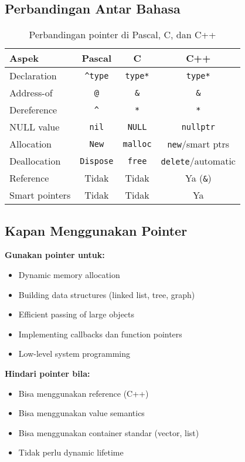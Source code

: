 \documentclass[../main.tex]{subfiles}
\begin{document}
\subsection{Perbandingan Antar Bahasa}

\begin{table}[H]
\centering
\begin{tabular}{|l|c|c|c|}
\hline
\textbf{Aspek} & \textbf{Pascal} & \textbf{C} & \textbf{C++} \\
\hline
Declaration & \texttt{\^{}type} & \texttt{type*} & \texttt{type*} \\
\hline
Address-of & \texttt{@} & \texttt{\&} & \texttt{\&} \\
\hline
Dereference & \texttt{\^{}} & \texttt{*} & \texttt{*} \\
\hline
NULL value & \texttt{nil} & \texttt{NULL} & \texttt{nullptr} \\
\hline
Allocation & \texttt{New} & \texttt{malloc} & \texttt{new}/smart ptrs \\
\hline
Deallocation & \texttt{Dispose} & \texttt{free} & \texttt{delete}/automatic \\
\hline
Reference & Tidak & Tidak & Ya (\texttt{\&}) \\
\hline
Smart pointers & Tidak & Tidak & Ya \\
\hline
\end{tabular}
\caption{Perbandingan pointer di Pascal, C, dan C++}
\end{table}

\subsection{Kapan Menggunakan Pointer}

\textbf{Gunakan pointer untuk:}
\begin{itemize}
  \item Dynamic memory allocation
  \item Building data structures (linked list, tree, graph)
  \item Efficient passing of large objects
  \item Implementing callbacks dan function pointers
  \item Low-level system programming
\end{itemize}

\textbf{Hindari pointer bila:}
\begin{itemize}
  \item Bisa menggunakan reference (C++)
  \item Bisa menggunakan value semantics
  \item Bisa menggunakan container standar (vector, list)
  \item Tidak perlu dynamic lifetime
\end{itemize}
\end{document}
